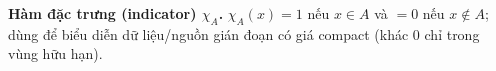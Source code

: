 \textbf{Hàm đặc trưng (indicator) $\chi_A$.}
$\chi_A(x)=1$ nếu $x\in A$ và $=0$ nếu $x\notin A$; dùng để biểu diễn dữ liệu/nguồn gián đoạn có giá compact (khác 0 chỉ trong vùng hữu hạn).
